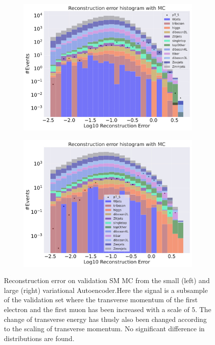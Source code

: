 \begin{figure}[h!]
    \centering
    \begin{subfigure}{.45\textwidth}
        \includegraphics[width=\textwidth]{Figures/VAE_testing/small/b_data_recon_big_rm3_feats_sig_pT_5.pdf}
        \caption{}
        \label{fig:VAE_small_pt_5}
    \end{subfigure}
    \hfill 
    \begin{subfigure}{.45\textwidth}
        \includegraphics[width=\textwidth]{Figures/VAE_testing/big/b_data_recon_big_rm3_feats_sig_pT_5.pdf}
        \caption{ }
        \label{fig:VAE_big_pt_5}
    \end{subfigure}
    \hfill 
    \caption[VAE | Reconstruction error $p_T$ altering of 5]{Reconstruction error on validation SM MC from the small (left) and large (right) variational Autoencoder.Here the signal is a subsample of the validation 
    set where the transverse momentum of the first electron and the first muon has been increased with a scale of $5$. The change of transverse 
    energy has thusly also been changed according to the scaling of transverse momentum.  No significant difference in distributions are found.  }
    \label{fig:VAE_big_small_pt_5}
\end{figure}


